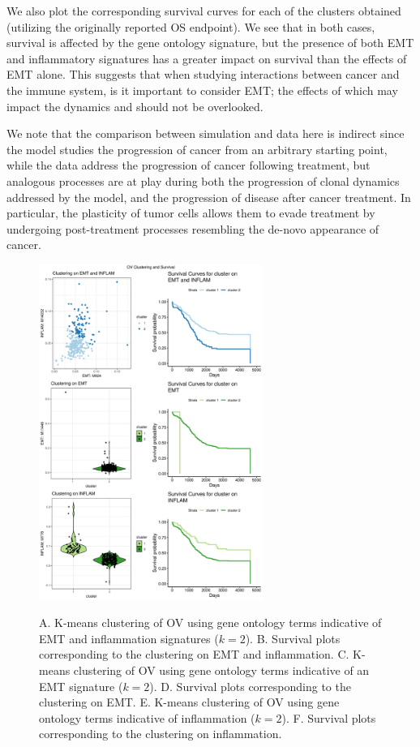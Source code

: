 \documentclass[11pt]{article}
\begin{document}
We also plot the corresponding survival curves for each of the clusters obtained (utilizing the originally reported OS endpoint).
We see that in both cases, survival is affected by the gene ontology signature, but the presence of both EMT and inflammatory signatures has a greater impact on survival than the effects of EMT alone.
This suggests that when studying interactions between cancer and the immune system, is it important to consider EMT; the effects of which may impact the dynamics and should not be overlooked. 


We note that the comparison between simulation and data here is indirect since the model studies the progression of cancer from an arbitrary starting point, while the data address the progression of cancer following treatment, but analogous processes are at play during both the progression of  clonal dynamics addressed by the model, and the progression of disease after cancer treatment.
In particular, the plasticity of tumor cells allows them to evade treatment by undergoing post-treatment processes resembling the de-novo appearance of cancer\cite{sanchez2018slow}.



\begin{figure}
\center
{\includegraphics[width=0.65\textwidth]{Figure6/OV.pdf}}
\caption{A. K-means clustering of OV using gene ontology terms indicative of EMT and inflammation signatures ($k=2$).
B. Survival plots corresponding to the clustering on EMT and inflammation.
C. K-means clustering of OV using gene ontology terms indicative of an EMT signature ($k=2$).
D. Survival plots corresponding to the clustering on EMT.
E. K-means clustering of OV using gene ontology terms indicative of inflammation ($k=2$).
F. Survival plots corresponding to the clustering on inflammation.}
\label{fig:OV}
\end{figure}
\end{document}
